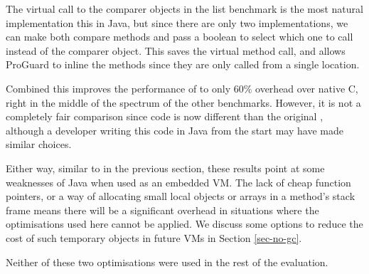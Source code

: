 The virtual call to the comparer objects in the list benchmark is the most natural implementation this in Java, but since there are only two implementations, we can make both compare methods  and pass a boolean to select which one to call instead of the comparer object. This saves the virtual method call, and allows ProGuard to inline the methods since they are only called from a single location.

Combined this improves the performance of  to only 60\% overhead over native C, right in the middle of the spectrum of the other benchmarks. However, it is not a completely fair comparison since code is now different than the original , although a developer writing this code in Java from the start may have made similar choices.

Either way, similar to  in the previous section, these results point at some weaknesses of Java when used as an embedded VM. The lack of cheap function pointers, or a way of allocating small local objects or arrays in a method's stack frame means there will be a significant overhead in situations where the optimisations used here cannot be applied. We discuss some options to reduce the cost of such temporary objects in future VMs in Section \ref{sec-no-gc}.

Neither of these two optimisations were used in the rest of the evaluation.



















